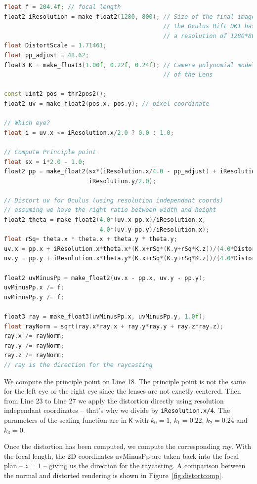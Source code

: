 \documentclass[12pt, twoside]{article}
\begin{document}
\begin{lstlisting}[language=C++, caption={C++ code for the Lens distortion}, label={lst:lensray}]
float f = 204.4f; // focal length
float2 iResolution = make_float2(1280, 800); // Size of the final image:
                                             // the Oculus Rift DK1 has
                                             // a resolution of 1280*800
float DistortScale = 1.71461;
float pp_adjust = 48.62;
float3 K = make_float3(1.00f, 0.22f, 0.24f); // Camera polynomial model
                                             // of the Lens

const uint2 pos = thr2pos2();
float2 uv = make_float2(pos.x, pos.y); // pixel coordinate
    
// Which eye?
float i = uv.x <= iResolution.x/2.0 ? 0.0 : 1.0;

// Compute Principle point
float sx = i*2.0 - 1.0;
float2 pp = make_float2(sx*(iResolution.x/4.0 - pp_adjust) + iResolution.x/2.0,
                        iResolution.y/2.0);

// Distort uv for Oculus (using resolution independant coords)
// assuming we have the right ratio between width and height
float2 theta = make_float2(4.0*(uv.x-pp.x)/iResolution.x,
                           4.0*(uv.y-pp.y)/iResolution.x);
float rSq= theta.x * theta.x + theta.y * theta.y;
uv.x = pp.x + iResolution.x*theta.x*(K.x+rSq*(K.y+rSq*K.z))/(4.0*DistortScale);
uv.y = pp.y + iResolution.x*theta.y*(K.x+rSq*(K.y+rSq*K.z))/(4.0*DistortScale);

float2 uvMinusPp = make_float2(uv.x - pp.x, uv.y - pp.y);
uvMinusPp.x /= f;
uvMinusPp.y /= f;

float3 ray = make_float3(uvMinusPp.x, uvMinusPp.y, 1.0f);
float rayNorm = sqrt(ray.x*ray.x + ray.y*ray.y + ray.z*ray.z);
ray.x /= rayNorm;
ray.y /= rayNorm;
ray.z /= rayNorm;
// ray is the direction for the raycasting
\end{lstlisting}

We compute the principle point on Line 18. The principle point is not the same for the left eye or the right eye since the lenses are not exactly centered. Then from Line 23 to Line 27 we apply the distortion directly using resolution independant coordinates -- that's why we divide by \texttt{iResolution.x/4}. The parameters of the scaling function are in \texttt{K} with $k_0 = 1$, $k_1 = 0.22$, $k_2 = 0.24$ and $k_3 = 0$.

Once the distortion has been computed, we compute the corresponding ray. With the focal length, the 2D coordinates uvMinusPp are taken back into the focal plan -- $z = 1$ -- giving us the direction for the raycasting. A comparison between the normal and distorted rendering is shown in Figure~\ref{fig:distortcomp}.
\end{document}
